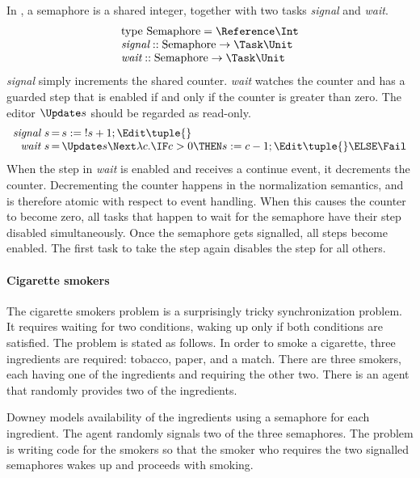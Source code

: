 In \TOP, a semaphore is a shared integer, together with two tasks \emph{signal} and \emph{wait}.
\begin{equation*}
  \begin{array}{l}
  \text{type}\ \text{Semaphore} = \Reference \Int \\
  \textit{signal} :: \text{Semaphore} \to \Task \Unit \\
  \textit{wait}   :: \text{Semaphore} \to \Task \Unit
  \end{array}
\end{equation*}
\emph{signal} simply increments the shared counter.
\emph{wait} watches the counter and has a guarded step that is enabled if and only if the counter is greater than zero.
The editor $\Update s$ should be regarded as read-only.
\begin{equation*}
  \begin{array}{r @{\,} c @{\,} l}
    \textit{signal}\ s & = & s := {!s} + 1; \Edit \tuple{} \\
    \textit{wait}\ s   & = & \Update s \Next \lambda c. \IF c > 0 \THEN s := c - 1; \Edit \tuple{} \ELSE \Fail
  \end{array}
\end{equation*}
When the step in \emph{wait} is enabled and receives a continue event, it decrements the counter.
Decrementing the counter happens in the normalization semantics, and is therefore atomic with respect to event handling.
When this causes the counter to become zero, all tasks that happen to wait for the semaphore have their step disabled simultaneously.
Once the semaphore gets signalled, all steps become enabled.
The first task to take the step again disables the step for all others.


\paragraph{Cigarette smokers}

The cigarette smokers problem \cite{books/Downey08LBOS} is a surprisingly tricky synchronization problem.
It requires waiting for two conditions, waking up only if both conditions are satisfied.
The problem is stated as follows.
In order to smoke a cigarette, three ingredients are required: tobacco, paper, and a match.
There are three smokers, each having one of the ingredients and requiring the other two.
There is an agent that randomly provides two of the ingredients.

Downey models availability of the ingredients using a semaphore for each ingredient.
The agent randomly signals two of the three semaphores.
The problem is writing code for the smokers so that the smoker who requires the two signalled semaphores wakes up and proceeds with smoking.

